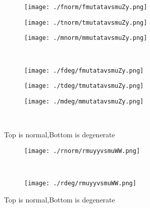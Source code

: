 \documentclass[aps,floats,floatfix,nofootinbib]{revtex4-1}
\begin{document}
\begin{center}
\begin{figure}
\begin{subfigure}{0.3\textwidth}
\texttt{[image: ./fnorm/fmutatavsmuZy.png]}
\label{}
\end{subfigure}
\begin{subfigure}{0.3\textwidth}
\texttt{[image: ./tnorm/tmutatavsmuZy.png]}
\label{}
\end{subfigure}
\begin{subfigure}{0.3\textwidth}
\texttt{[image: ./mnorm/mmutatavsmuZy.png]}
\label{}
\end{subfigure}\\
\begin{subfigure}{0.3\textwidth}
\texttt{[image: ./fdeg/fmutatavsmuZy.png]}
\label{}
\end{subfigure}
\begin{subfigure}{0.3\textwidth}
\texttt{[image: ./tdeg/tmutatavsmuZy.png]}
\label{}
\end{subfigure}
\begin{subfigure}{0.3\textwidth}
\texttt{[image: ./mdeg/mmutatavsmuZy.png]}
\label{}
\end{subfigure}\\
\caption{Top is normal,Bottom is degenerate}
\end{figure}
\end{center}

\begin{center}
\begin{figure}
\begin{subfigure}{0.95\textwidth}
\texttt{[image: ./rnorm/rmuyyvsmuWW.png]}
\label{}
\end{subfigure}\\
\begin{subfigure}{0.95\textwidth}
\texttt{[image: ./rdeg/rmuyyvsmuWW.png]}
\label{}
\end{subfigure}
\caption{Top is normal,Bottom is degenerate}
\end{figure}
\end{center}
\end{document}
